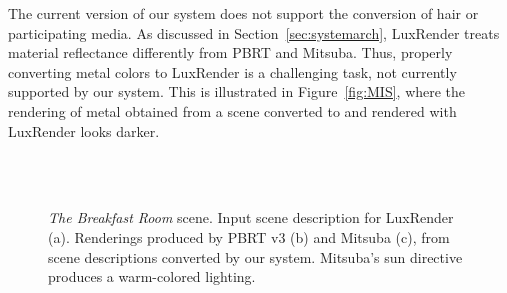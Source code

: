 The current version of our system does not support the conversion of hair or participating media. 
%
As discussed in Section~\ref{sec:systemarch}, LuxRender treats material reflectance differently from PBRT and Mitsuba. Thus, properly converting metal colors to LuxRender is a challenging task, not currently supported by our system. This is illustrated in Figure~\ref{fig:MIS}, where the rendering of metal obtained from a scene converted to and rendered with LuxRender looks darker.  

\begin{figure}
  \centering
  \\
  \\
  \caption{\textit{The Breakfast Room} scene. Input scene description for LuxRender (a). Renderings produced by PBRT v3 (b) and Mitsuba (c), from scene descriptions converted by our system. Mitsuba's sun directive produces a warm-colored lighting.}
  \label{fig:dining-room}
\end{figure}

